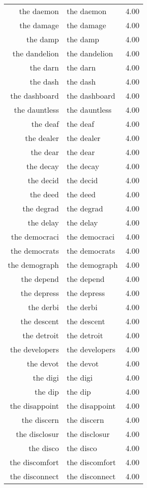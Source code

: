 \begin{table}[ht]
\begin{tabular}{rlr}
  the daemon & the daemon & 4.00 \\ 
  the damage & the damage & 4.00 \\ 
  the damp & the damp & 4.00 \\ 
  the dandelion & the dandelion & 4.00 \\ 
  the darn & the darn & 4.00 \\ 
  the dash & the dash & 4.00 \\ 
  the dashboard & the dashboard & 4.00 \\ 
  the dauntless & the dauntless & 4.00 \\ 
  the deaf & the deaf & 4.00 \\ 
  the dealer & the dealer & 4.00 \\ 
  the dear & the dear & 4.00 \\ 
  the decay & the decay & 4.00 \\ 
  the decid & the decid & 4.00 \\ 
  the deed & the deed & 4.00 \\ 
  the degrad & the degrad & 4.00 \\ 
  the delay & the delay & 4.00 \\ 
  the democraci & the democraci & 4.00 \\ 
  the democrats & the democrats & 4.00 \\ 
  the demograph & the demograph & 4.00 \\ 
  the depend & the depend & 4.00 \\ 
  the depress & the depress & 4.00 \\ 
  the derbi & the derbi & 4.00 \\ 
  the descent & the descent & 4.00 \\ 
  the detroit & the detroit & 4.00 \\ 
  the developers & the developers & 4.00 \\ 
  the devot & the devot & 4.00 \\ 
  the digi & the digi & 4.00 \\ 
  the dip & the dip & 4.00 \\ 
  the disappoint & the disappoint & 4.00 \\ 
  the discern & the discern & 4.00 \\ 
  the disclosur & the disclosur & 4.00 \\ 
  the disco & the disco & 4.00 \\ 
  the discomfort & the discomfort & 4.00 \\ 
  the disconnect & the disconnect & 4.00 \\ 

\end{tabular}
\end{table}
